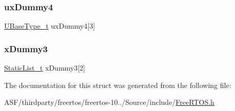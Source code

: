 \mbox{\label{structx_s_t_a_t_i_c___q_u_e_u_e_a8c2bd4532fb12e9c4ca67d2a5b0afc1a}} 
\subsubsection{\texorpdfstring{uxDummy4}{uxDummy4}}
{\footnotesize\ttfamily \mbox{\hyperlink{portmacro_8h_a646f89d4298e4f5afd522202b11cb2e6}{U\+Base\+Type\+\_\+t}} ux\+Dummy4\mbox{[}3\mbox{]}}

\mbox{\label{structx_s_t_a_t_i_c___q_u_e_u_e_a2ea20ae87a814cd673deba85bbc35e5b}} 
\subsubsection{\texorpdfstring{xDummy3}{xDummy3}}
{\footnotesize\ttfamily \mbox{\hyperlink{_free_r_t_o_s_8h_a9735ad9101a2bd25f83a62089a4acee6}{Static\+List\+\_\+t}} x\+Dummy3\mbox{[}2\mbox{]}}



The documentation for this struct was generated from the following file\+:\begin{DoxyCompactItemize}
\item 
A\+S\+F/thirdparty/freertos/freertos-\/10../\+Source/include/\mbox{\hyperlink{_free_r_t_o_s_8h}{Free\+R\+T\+O\+S.\+h}}\end{DoxyCompactItemize}
